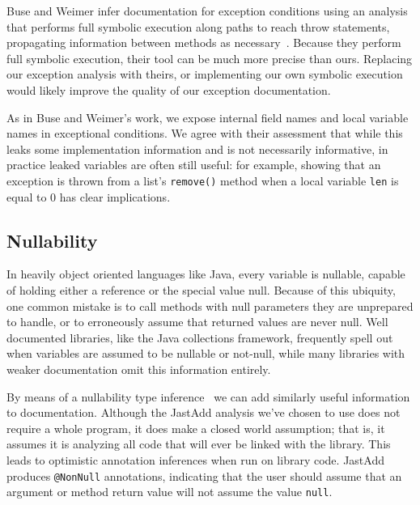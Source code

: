Buse and Weimer infer documentation for exception conditions
using an analysis that performs full symbolic execution along paths to reach throw
statements, propagating information between methods as necessary~\cite{autodoc}.
Because they
perform full symbolic execution, their tool can be much more precise than ours.
Replacing our exception analysis with theirs, or implementing our own symbolic
execution would likely improve the quality of our exception documentation.  

As in Buse and Weimer's work, we expose internal field names and
local variable names in exceptional conditions.  We agree with their assessment
that while this leaks some
implementation information and is not necessarily informative, in practice
leaked variables are often still useful: for example, showing that an exception is
thrown from a list's \texttt{remove()} method when a local variable \texttt{len}
is equal to 0 has clear implications.

\subsection{Nullability}
\label{sec:Nullability}

In heavily object oriented languages like Java, every variable is nullable,
capable of holding either a reference or the
special value null.  Because of this ubiquity, one common mistake is to call
methods with null parameters they are unprepared to handle, or to erroneously
assume that returned values are never null.  Well documented libraries, like
the Java collections framework, frequently spell out when variables are
assumed to be nullable or not-null, while many libraries with weaker
documentation omit this information entirely.

By means of a nullability type inference~\cite{NonNullTypeInference} we can add
similarly useful information to documentation.  Although the JastAdd analysis
we've chosen to use does not require a whole program, it does make a closed
world assumption; that is, it assumes it is analyzing all code that will ever be
linked with the library.  This leads to optimistic annotation inferences when run on
library code.  JastAdd produces \texttt{@NonNull} annotations, indicating that the user should assume that an
argument or method return value will not assume the value \texttt{null}.
